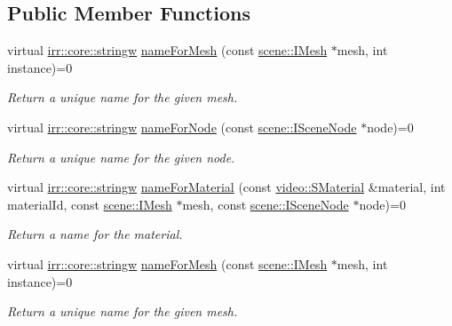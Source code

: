\subsection*{Public Member Functions}
\begin{DoxyCompactItemize}
\item 
virtual \hyperlink{namespaceirr_1_1core_a5aedb62cb47cf01d1c548ab5e6344d2d}{irr\+::core\+::stringw} \hyperlink{classirr_1_1scene_1_1IColladaMeshWriterNames_a2d36f1dee5904b3c622363282761ed0d}{name\+For\+Mesh} (const \hyperlink{classirr_1_1scene_1_1IMesh}{scene\+::\+I\+Mesh} $\ast$mesh, int instance)=0
\begin{DoxyCompactList}\small\item\em Return a unique name for the given mesh. \end{DoxyCompactList}\item 
virtual \hyperlink{namespaceirr_1_1core_a5aedb62cb47cf01d1c548ab5e6344d2d}{irr\+::core\+::stringw} \hyperlink{classirr_1_1scene_1_1IColladaMeshWriterNames_a60d3fdad90edc25b0305c91be15b255f}{name\+For\+Node} (const \hyperlink{classirr_1_1scene_1_1ISceneNode}{scene\+::\+I\+Scene\+Node} $\ast$node)=0
\begin{DoxyCompactList}\small\item\em Return a unique name for the given node. \end{DoxyCompactList}\item 
virtual \hyperlink{namespaceirr_1_1core_a5aedb62cb47cf01d1c548ab5e6344d2d}{irr\+::core\+::stringw} \hyperlink{classirr_1_1scene_1_1IColladaMeshWriterNames_acb5c8f38769d3fedcc76df73d9350c07}{name\+For\+Material} (const \hyperlink{classirr_1_1video_1_1SMaterial}{video\+::\+S\+Material} \&material, int material\+Id, const \hyperlink{classirr_1_1scene_1_1IMesh}{scene\+::\+I\+Mesh} $\ast$mesh, const \hyperlink{classirr_1_1scene_1_1ISceneNode}{scene\+::\+I\+Scene\+Node} $\ast$node)=0
\begin{DoxyCompactList}\small\item\em Return a name for the material. \end{DoxyCompactList}\item 
virtual \hyperlink{namespaceirr_1_1core_a5aedb62cb47cf01d1c548ab5e6344d2d}{irr\+::core\+::stringw} \hyperlink{classirr_1_1scene_1_1IColladaMeshWriterNames_a2d36f1dee5904b3c622363282761ed0d}{name\+For\+Mesh} (const \hyperlink{classirr_1_1scene_1_1IMesh}{scene\+::\+I\+Mesh} $\ast$mesh, int instance)=0
\begin{DoxyCompactList}\small\item\em Return a unique name for the given mesh. \end{DoxyCompactList}\item 

\end{DoxyCompactItemize}

